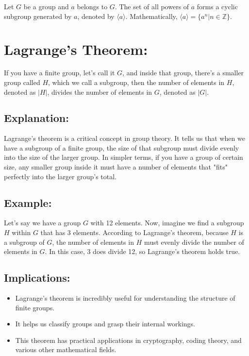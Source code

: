 \documentclass[11pt]{article}
\begin{document}
Let $G$ be a group and $a$ belongs to $G$.
The set of all powers of $a$ forms a cyclic subgroup generated by $a$, denoted by $\langle a \rangle$.
Mathematically, $\langle a \rangle = \{a^n | n \in \mathbb{Z}\}$.


\section{Lagrange's Theorem:}

If you have a finite group, let's call it \( G \), and inside that group, there's a smaller group called \( H \), which we call a subgroup, then the number of elements in \( H \), denoted as \( |H| \), divides the number of elements in \( G \), denoted as \( |G| \).

\subsection{Explanation:}

Lagrange's theorem is a critical concept in group theory. It tells us that when we have a subgroup of a finite group, the size of that subgroup must divide evenly into the size of the larger group. In simpler terms, if you have a group of certain size, any smaller group inside it must have a number of elements that "fits" perfectly into the larger group's total.

\subsection{Example:}

Let's say we have a group \( G \) with 12 elements. Now, imagine we find a subgroup \( H \) within \( G \) that has 3 elements. According to Lagrange's theorem, because \( H \) is a subgroup of \( G \), the number of elements in \( H \) must evenly divide the number of elements in \( G \). In this case, 3 does divide 12, so Lagrange's theorem holds true.

\subsection{Implications:}

\begin{itemize}
    \item Lagrange's theorem is incredibly useful for understanding the structure of finite groups.
    \item It helps us classify groups and grasp their internal workings.
    \item This theorem has practical applications in cryptography, coding theory, and various other mathematical fields.
\end{itemize}
\end{document}
